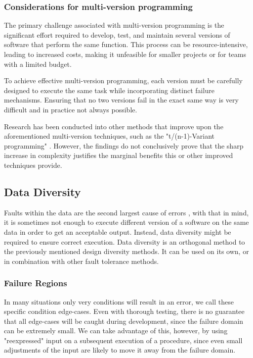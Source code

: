 \documentclass[12pt, letterpaper]{article}
\begin{document}
\subsubsection{Considerations for multi-version programming}

The primary challenge associated with multi-version programming is the significant effort required to develop, test, and maintain several versions of software that perform the same function. This process can be resource-intensive, leading to increased costs, making it unfeasible for smaller projects or for teams with a limited budget.

To achieve effective multi-version programming, each version must be carefully designed to execute the same task while incorporating distinct failure mechanisms. Ensuring that no two versions fail in the exact same way is very difficult and in practice not always possible.

Research has been conducted into other methods that improve upon the aforementioned multi-version techniques, such as the "t/(n-1)-Variant programming" \cite{589928}. However, the findings do not conclusively prove that the sharp increase in complexity justifies the marginal benefits this or other improved techniques provide.

\subsection{Data Diversity}

Faults within the data are the second largest cause of errors \cite{nasa:stats}, with that in mind, it is sometimes not enough to execute different version of a software on the same data in order to get an acceptable output. Instead, data diversity might be required to ensure correct execution. Data diversity is an orthogonal method to the previously mentioned design diversity methods. It can be used on its own, or in combination with other fault tolerance methods.

\subsubsection{Failure Regions}

In many situations only very conditions will result in an error, we call these specific condition edge-cases. Even with thorough testing, there is no guarantee that all edge-cases will be caught during development, since the failure domain can be extremely small. We can take advantage of this, however, by using "reexpressed" input on a subsequent execution of a procedure, since even small adjustments of the input are likely to move it away from the failure domain. 
\end{document}
